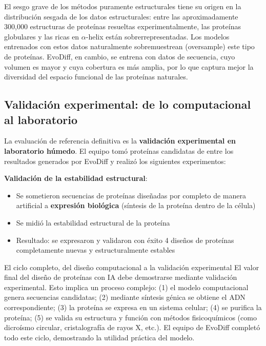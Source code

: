 \documentclass[a4paper]{article}
\begin{document}
El sesgo grave de los métodos puramente estructurales tiene su origen en la distribución sesgada de los datos estructurales: entre las aproximadamente 300,000 estructuras de proteínas resueltas experimentalmente, las proteínas globulares y las ricas en $\alpha$-helix están sobrerrepresentadas. Los modelos entrenados con estos datos naturalmente sobremuestrean (oversample) este tipo de proteínas. EvoDiff, en cambio, se entrena con datos de secuencia, cuyo volumen es mayor y cuya cobertura es más amplia, por lo que captura mejor la diversidad del espacio funcional de las proteínas naturales.

\subsection{Validación experimental: de lo computacional al laboratorio}

La evaluación de referencia definitiva es la \textbf{validación experimental en laboratorio húmedo}. El equipo tomó proteínas candidatas de entre los resultados generados por EvoDiff y realizó los siguientes experimentos:

\textbf{Validación de la estabilidad estructural}:
\begin{itemize}
    \item Se sometieron secuencias de proteínas diseñadas por completo de manera artificial a \textbf{expresión biológica} (síntesis de la proteína dentro de la célula)
    \item Se midió la estabilidad estructural de la proteína
    \item Resultado: se expresaron y validaron con éxito 4 diseños de proteínas completamente nuevas y estructuralmente estables
\end{itemize}

\begin{knowledgebox}{El ciclo completo, del diseño computacional a la validación experimental}
El valor final del diseño de proteínas con IA debe demostrarse mediante validación experimental. Esto implica un proceso complejo: (1) el modelo computacional genera secuencias candidatas; (2) mediante síntesis génica se obtiene el ADN correspondiente; (3) la proteína se expresa en un sistema celular; (4) se purifica la proteína; (5) se valida su estructura y función con métodos fisicoquímicos (como dicroísmo circular, cristalografía de rayos X, etc.). El equipo de EvoDiff completó todo este ciclo, demostrando la utilidad práctica del modelo.
\end{knowledgebox}
\end{document}
